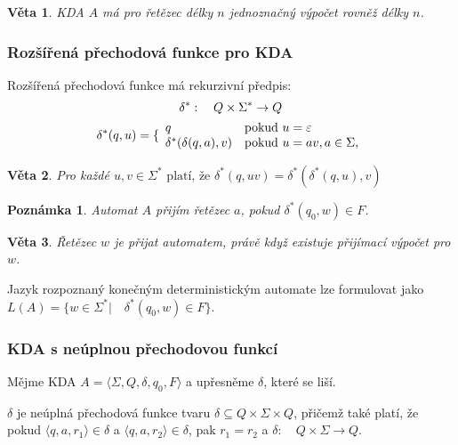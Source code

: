 \documentclass[10pt,a4paper]{article}
\theoremstyle{note}
\newtheorem{veta}{Věta}
\newtheorem{poznamka}{Poznámka}
\begin{document}
\begin{veta}
KDA $A$ má pro řetězec délky $n$ jednoznačný výpočet rovněž délky $n$.
\end{veta}

\subsubsection{Rozšířená přechodová funkce pro KDA}

Rozšířená přechodová funkce má rekurzivní předpis:
\begin{gather*}
\delta^*:\quad Q \times \Sigma^* \rightarrow Q \\
\delta^*(q, u) = \lbrace
\begin{array}{l l}
q & \text{pokud } u = \varepsilon \\
\delta^*(\delta(q, a), v) & \text{pokud } u = av, a \in \Sigma, 
\end{array}
\end{gather*}

\begin{veta}\label{veta-kdaaa}
Pro každé $u,v \in \Sigma^* \text{ platí, že } \delta^*(q, uv) = \delta^*(\delta^*(q, u), v)$
\end{veta}


\begin{poznamka}
Automat $A$ přijím řetězec $a$, pokud $\delta^*(q_0,w) \in F$.
\end{poznamka}

\begin{veta}
Řetězec $w$ je přijat automatem, právě když existuje přijímací výpočet pro $w$.
\end{veta}


Jazyk rozpoznaný konečným deterministickým automate lze formulovat jako
$L(A) = \lbrace w \in \Sigma^* |\quad \delta^*(q_0,w) \in F \rbrace$.

\subsubsection{KDA s neúplnou přechodovou funkcí}

Mějme KDA $A = \langle \Sigma, Q, \delta, q_0, F \rangle$ a upřesněme $\delta$, které se liší.

$\delta$ je neúplná přechodová funkce tvaru $\delta \subseteq Q \times \Sigma \times Q$, přičemž také platí, že
pokud $\langle q, a, r_1 \rangle \in \delta$ a $\langle q,a,r_2 \rangle \in \delta$, pak $r_1 = r_2$ a $\delta:\quad Q \times \Sigma \rightarrow Q$.
\end{document}
